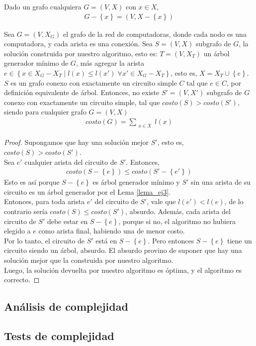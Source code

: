 \begin{notacion}
Dado un grafo cualquiera $G = (V,X)$ con $x \in X$, 
\begin{align*}
G - \left\{x\right\} = (V, X - \left\{x\right\})
\end{align*}
\end{notacion}

\begin{correctitud}
Sea $G = (V,X_G)$ el grafo de la red de computadoras, donde cada nodo es una computadora, y cada arista es una conexión. Sea $S = (V,X)$ subgrafo de $G$, la solución construida por nuestro algoritmo, esto es: $T = (V, X_T)$ un árbol generador mínimo de $G$, más agregar la arista $e \in \left\{x \in X_G - X_T \mid l(x) \leq l(x') \; \forall x' \in X_G - X_T \right\}$, esto es, $X = X_T \cup \left\{e\right\}$. $S$ es un grafo conexo con exactamente un circuito simple $C$ tal que $e \in C$, por definición equivalente de árbol. Entonces, no existe $S' = (V,X')$ subgrafo de $G$ conexo con exactamente un circuito simple, tal que $costo(S) > costo(S')$, siendo para cualquier grafo $G = (V,X)$
\begin{align*}
costo(G) = \sum\limits_{\substack{x \in X}} l(x)
\end{align*}
\end{correctitud}
\begin{proof}
Supongamos que hay una solución mejor $S'$, esto es, $costo(S) > costo(S')$. \\
\noindent Sea $e'$ cualquier arista del circuito de $S'$. Entonces,
\begin{align*}
costo(S - \left\{e\right\}) \leq costo(S' - \left\{e'\right\})
\end{align*}
Esto es así porque $S - \left\{e\right\}$ es árbol generador mínimo y $S'$ sin una arista de su circuito es un árbol generador por el Lema \ref{lema_ej3}. \\
Entonces, para toda arista $e'$ del circuito de $S'$, vale que $l(e') < l(e)$, de lo contrario sería $costo(S) \leq costo(S')$, absurdo.
Además, cada arista del circuito de $S'$ debe estar en $S - \left\{e\right\}$, porque si no, el algoritmo no hubiera elegido a $e$ como arista final, habiendo una de menor costo. \\
Por lo tanto, el circuito de $S'$ está en $S - \left\{e\right\}$. Pero entonces $S - \left\{e\right\}$ tiene un circuito siendo un árbol, absurdo. El absurdo provino de suponer que hay una solución mejor que la construida por nuestro algoritmo. \\
Luego, la solución devuelta por nuestro algoritmo es óptima, y el algoritmo es correcto.
\end{proof}

\subsection{Análisis de complejidad}

\subsection{Tests de complejidad}
